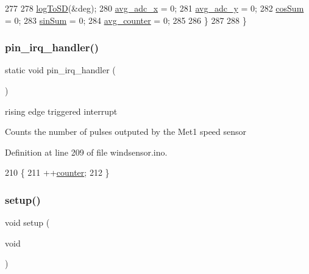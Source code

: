 \begin{DoxyCode}
277         
278         \mbox{\hyperlink{windsensor_8ino_a6125069fcf9a9e592937a7b143c4ce7a}{logToSD}}(&deg);
280         \mbox{\hyperlink{windsensor_8ino_a4e68dc721cdeec90403f8d51073a0ff7}{avg\_adc\_x}} = 0;
281         \mbox{\hyperlink{windsensor_8ino_a9721778a8fa458f3ae824eceb7d8f703}{avg\_adc\_y}} = 0;
282         \mbox{\hyperlink{windsensor_8ino_ae99d45425d50ae8be8137abd39020329}{cosSum}} = 0;
283         \mbox{\hyperlink{windsensor_8ino_af16089af53c1a813d5decdf37fd8382f}{sinSum}} = 0;
284         \mbox{\hyperlink{windsensor_8ino_a7f1aa577037cdb41a6226fd5f24143be}{avg\_counter}} = 0;
285         
286     \}
287     
288 \}
\end{DoxyCode}
\mbox{\label{windsensor_8ino_a326020c34cf7bde02de2cafe8f9e62c1}} 
\subsubsection{\texorpdfstring{pin\+\_\+irq\+\_\+handler()}{pin\_irq\_handler()}}
{\footnotesize\ttfamily static void pin\+\_\+irq\+\_\+handler (\begin{DoxyParamCaption}{ }\end{DoxyParamCaption})\hspace{0.3cm}{\ttfamily [static]}}



rising edge triggered interrupt 

Counts the number of pulses outputed by the Met1 speed sensor 

Definition at line 209 of file windsensor.\+ino.


\begin{DoxyCode}
210 \{
211     ++\mbox{\hyperlink{windsensor_8ino_a3d4f497af9a194d9e03e5d9a9b0ee67d}{counter}};
212 \}
\end{DoxyCode}
\mbox{\label{windsensor_8ino_a7dfd9b79bc5a37d7df40207afbc5431f}} 
\subsubsection{\texorpdfstring{setup()}{setup()}}
{\footnotesize\ttfamily void setup (\begin{DoxyParamCaption}\item[{void}]{ }\end{DoxyParamCaption})}

